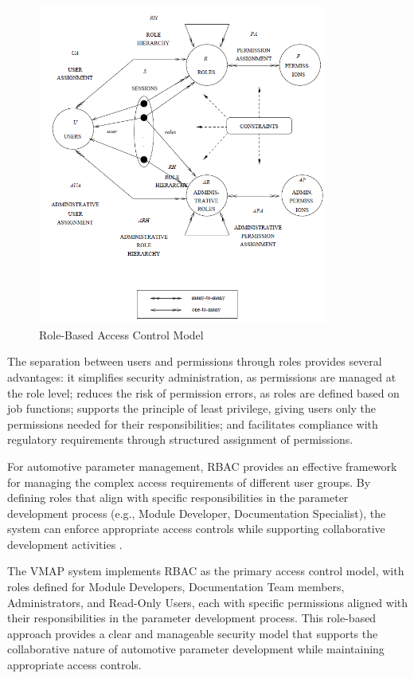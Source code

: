 \begin{figure}[ht]
    \centering
    \includegraphics[width=0.85\textwidth]{figures/rbac_model.png}
    \caption{Role-Based Access Control Model \cite{sandhu1998role}}
    \label{fig:rbac-model}
\end{figure}

The separation between users and permissions through roles provides several advantages: it simplifies security administration, as permissions are managed at the role level; reduces the risk of permission errors, as roles are defined based on job functions; supports the principle of least privilege, giving users only the permissions needed for their responsibilities; and facilitates compliance with regulatory requirements through structured assignment of permissions.

For automotive parameter management, RBAC provides an effective framework for managing the complex access requirements of different user groups. By defining roles that align with specific responsibilities in the parameter development process (e.g., Module Developer, Documentation Specialist), the system can enforce appropriate access controls while supporting collaborative development activities \cite{ferraiolo2011policy}.

The VMAP system implements RBAC as the primary access control model, with roles defined for Module Developers, Documentation Team members, Administrators, and Read-Only Users, each with specific permissions aligned with their responsibilities in the parameter development process. This role-based approach provides a clear and manageable security model that supports the collaborative nature of automotive parameter development while maintaining appropriate access controls.

